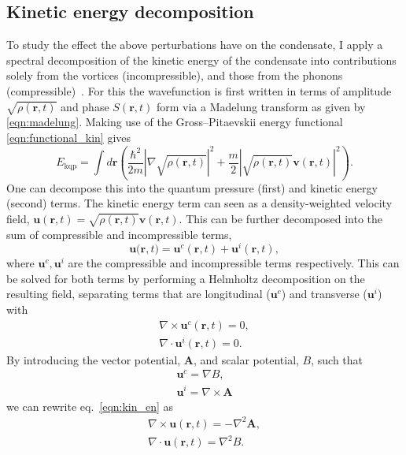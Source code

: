 \subsection{Kinetic energy decomposition}

To study the effect the above perturbations have on the condensate, I apply a spectral decomposition of the kinetic energy of the condensate into contributions solely from the vortices (incompressible), and those from the phonons (compressible)~\cite{CT:Nore_prl_1997,CT:Nore_pof_1997,CT:Bradley_prx_2012}. For this the wavefunction is first written in terms of amplitude $\sqrt{\rho(\mathbf{r},t)}$ and phase $S(\mathbf{r},t)$ form via a Madelung transform as given by \ref{eqn:madelung}. Making use of the Gross--Pitaevskii energy functional \ref{eqn:functional_kin} gives
\begin{equation}
    E_{\text{kqp}} = \int d\mathbf{r} \left( \frac{\hbar^2}{2m}| \nabla\sqrt{\rho(\mathbf{r},t)} |^2  + \frac{m}{2}|\sqrt{\rho(\mathbf{r},t)}\mathbf{v}(\mathbf{r},t) |^2\right).
\end{equation}
One can decompose this into the quantum pressure (first) and kinetic energy (second) terms. The kinetic energy term can seen as a density-weighted velocity field, $\mathbf{u}(\mathbf{r},t) = \sqrt{\rho(\mathbf{r},t)}\mathbf{v}(\mathbf{r},t)$. This can be further decomposed into the sum of compressible and incompressible terms,
\begin{equation}\label{eqn:kin_en}
    \mathbf{u(r},t) = \mathbf{u}^c(\mathbf{r},t) + \mathbf{u}^i(\mathbf{r},t),
\end{equation}
where $\mathbf{u}^c, \mathbf{u}^i$ are the compressible and incompressible terms respectively. This can be solved for both terms by performing a Helmholtz decomposition on the resulting field, separating terms that are longitudinal ($\mathbf{u}^c$) and transverse ($\mathbf{u}^i$) with
\begin{subequations}\label{eqn:kinterms}
\begin{align}
    \nabla \times \mathbf{u}^c(\mathbf{r},t) = 0, \\
    \nabla \cdot \mathbf{u}^i(\mathbf{r},t) = 0.
\end{align}
\end{subequations}
By introducing the vector potential, $\mathbf{A}$, and scalar potential, $B$, such that
\begin{subequations}
\begin{align}
    \mathbf{u}^c = \nabla B, \\
    \mathbf{u}^i = \nabla \times \mathbf{A}
\end{align}
\end{subequations}
we can rewrite eq.~\ref{eqn:kin_en} as
\begin{align}
    \nabla \times \mathbf{u}(\mathbf{r},t) = -\nabla^2 \mathbf{A}, \\
    \nabla \cdot \mathbf{u}(\mathbf{r},t) = \nabla^2 {B}.
\end{align}

